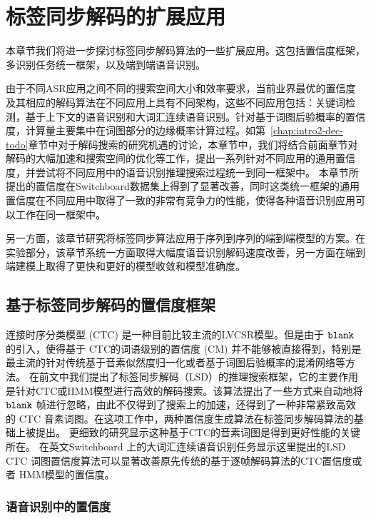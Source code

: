 
\chapter{标签同步解码的扩展应用}

本章节我们将进一步探讨标签同步解码算法的一些扩展应用。这包括置信度框架，多识别任务统一框架，以及端到端语音识别。

由于不同ASR应用之间不同的搜索空间大小和效率要求，当前业界最优的置信度及其相应的解码算法在不同应用上具有不同架构，这些不同应用包括：关键词检测，基于上下文的语音识别和大词汇连续语音识别。针对基于词图后验概率的置信度，计算量主要集中在词图部分的边缘概率计算过程。如第~\ref{chap:intro2-dec-todo}章节中对于解码搜索的研究机遇的讨论，本章节中，我们将结合前面章节对解码的大幅加速和搜索空间的优化等工作，提出一系列针对不同应用的通用置信度，并尝试将不同应用中的语音识别推理搜索过程统一到同一框架中。
本章节所提出的置信度在Switchboard数据集上得到了显著改善，同时这类统一框架的通用置信度在不同应用中取得了一致的非常有竞争力的性能，使得各种语音识别应用可以工作在同一框架中。

另一方面，该章节研究将标签同步算法应用于序列到序列的端到端模型的方案。在实验部分，该章节系统一方面取得大幅度语音识别解码速度改善，另一方面在端到端建模上取得了更快和更好的模型收敛和模型准确度。

\section{基于标签同步解码的置信度框架}
\label{chap:unify-confidence}


连接时序分类模型 (CTC) 是一种目前比较主流的LVCSR模型。但是由于 $\tt blank$ 的引入，使得基于 CTC的词语级别的置信度 (CM) 并不能够被直接得到，特别是最主流的针对传统基于音素似然度归一化或者基于词图后验概率的混淆网络等方法。
在前文中我们提出了标签同步解码（LSD）的推理搜索框架，它的主要作用是针对CTC或HMM模型进行高效的解码搜索。该算法提出了一些方式来自动地将 $\tt blank$ 帧进行忽略，由此不仅得到了搜索上的加速，还得到了一种非常紧致高效的 CTC 音素词图。在这项工作中，两种置信度生成算法在标签同步解码算法的基础上被提出。
更细致的研究显示这种基于CTC的音素词图是得到更好性能的关键所在。
在英文Switchboard 上的大词汇连续语音识别任务显示这里提出的LSD CTC 词图置信度算法可以显著改善原先传统的基于逐帧解码算法的CTC置信度或者 HMM模型的置信度。

\subsection{语音识别中的置信度}
\label{sec:intro}

